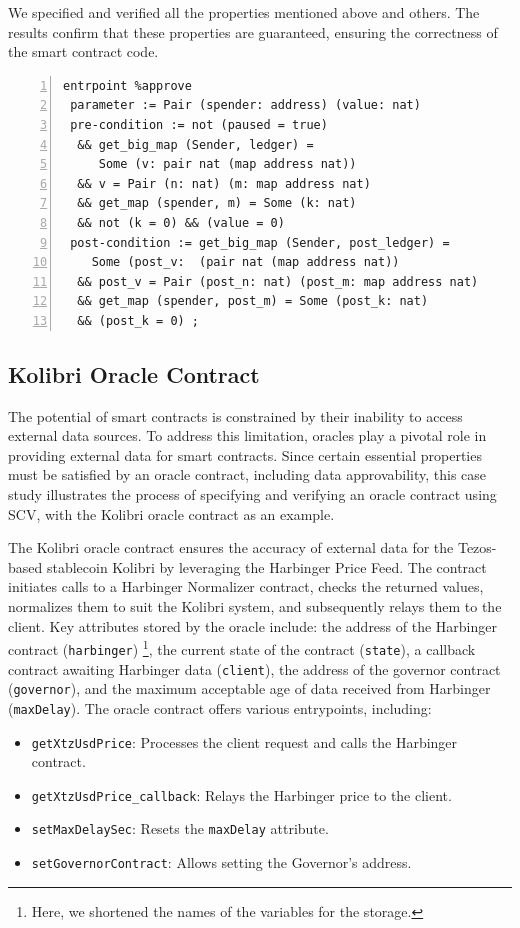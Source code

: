 \documentclass[runningheads]{llncs}
\begin{document}
We specified and verified all the properties mentioned above and others. The results confirm that these properties are guaranteed, ensuring the correctness of the smart contract code.
\begin{lstlisting}[float=tp,captionpos=b,caption={Specification of the \lstinline/approve/ entrypoint (Property 1)},label={lst:specification-approve-p1},numbers=left]
entrpoint %approve
 parameter := Pair (spender: address) (value: nat)
 pre-condition := not (paused = true)
  && get_big_map (Sender, ledger) = 
     Some (v: pair nat (map address nat))
  && v = Pair (n: nat) (m: map address nat) 
  && get_map (spender, m) = Some (k: nat) 
  && not (k = 0) && (value = 0)
 post-condition := get_big_map (Sender, post_ledger) = 
    Some (post_v:  (pair nat (map address nat))
  && post_v = Pair (post_n: nat) (post_m: map address nat) 
  && get_map (spender, post_m) = Some (post_k: nat) 
  && (post_k = 0) ;
\end{lstlisting}
\subsection{Kolibri Oracle Contract}
\label{sec:kolibri-oracle-contr}
The potential of smart contracts is constrained by their inability to access external data sources. To address this limitation, oracles play a pivotal role in providing external data for smart contracts. Since certain essential properties must be satisfied by an oracle contract, including data approvability, this case study illustrates the process of specifying and verifying an oracle contract using SCV, with the Kolibri oracle contract \cite{kolibri} as an example.

The Kolibri oracle contract ensures the accuracy of external data for the Tezos-based stablecoin Kolibri by leveraging the Harbinger Price Feed. The contract initiates calls to a Harbinger Normalizer contract, checks the returned values, normalizes them to suit the Kolibri system, and subsequently relays them to the client. Key attributes stored by the oracle include: the address of the Harbinger contract (\lstinline/harbinger/) \footnote{Here, we shortened the names of the variables for the storage.}, the current state of the contract (\lstinline/state/), a callback contract awaiting Harbinger data (\lstinline/client/), the address of the governor contract (\lstinline/governor/), and the maximum acceptable age of data received from Harbinger (\lstinline/maxDelay/). The oracle contract offers various entrypoints, including:
\begin{itemize}
\item \lstinline/getXtzUsdPrice/: Processes the client request and calls the Harbinger contract.
\item \lstinline/getXtzUsdPrice_callback/: Relays the Harbinger price to the client.
\item \lstinline/setMaxDelaySec/: Resets the \lstinline/maxDelay/ attribute.
\item \lstinline/setGovernorContract/: Allows setting the Governor's address.
\end{itemize}
\end{document}

